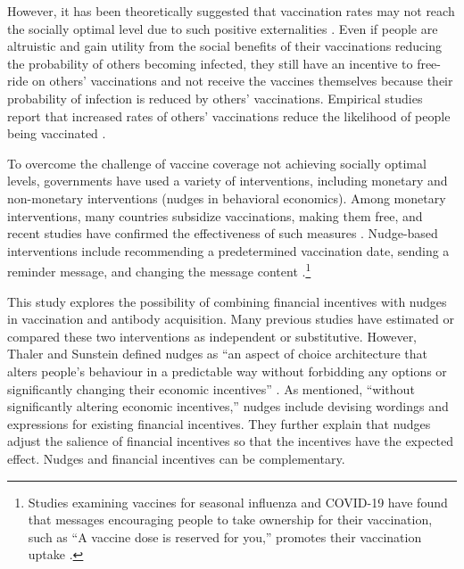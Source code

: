\documentclass[
  11pt,
  a4paper
]{article}
\begin{document}
However, it has been theoretically suggested that vaccination rates may not reach the socially optimal level due to such positive externalities \citep{Brito1991a, Francis1997, Stiglitz2000}. Even if people are altruistic and gain utility from the social benefits of their vaccinations reducing the probability of others becoming infected, they still have an incentive to free-ride on others' vaccinations and not receive the vaccines themselves because their probability of infection is reduced by others' vaccinations. Empirical studies report that increased rates of others' vaccinations reduce the likelihood of people being vaccinated \citep{Hershey1994, Ibuka2014}.

To overcome the challenge of vaccine coverage not achieving socially optimal levels, governments have used a variety of interventions, including monetary and non-monetary interventions (nudges in behavioral economics). Among monetary interventions, many countries subsidize vaccinations, making them free, and recent studies have confirmed the effectiveness of such measures \citep{Barber2022, Brehm2022}. Nudge-based interventions include recommending a predetermined vaccination date, sending a reminder message, and changing the message content \citep{Chapman2010, Sasaki2022, Yokum2018}.\footnote{Studies examining vaccines for seasonal influenza and COVID-19 have found that messages encouraging people to take ownership for their vaccination, such as ``A vaccine dose is reserved for you,'' promotes their vaccination uptake \citep{Dai2021, Milkman2021}.}

This study explores the possibility of combining financial incentives with nudges in vaccination and antibody acquisition. Many previous studies have estimated or compared these two interventions as independent or substitutive. However, Thaler and Sunstein defined nudges as ``an aspect of choice architecture that alters people's behaviour in a predictable way without forbidding any options or significantly changing their economic incentives'' \citep[p.6]{Thaler2009}. As mentioned, ``without significantly altering economic incentives,'' nudges include devising wordings and expressions for existing financial incentives. They further explain that nudges adjust the salience of financial incentives so that the incentives have the expected effect. Nudges and financial incentives can be complementary.
\end{document}
